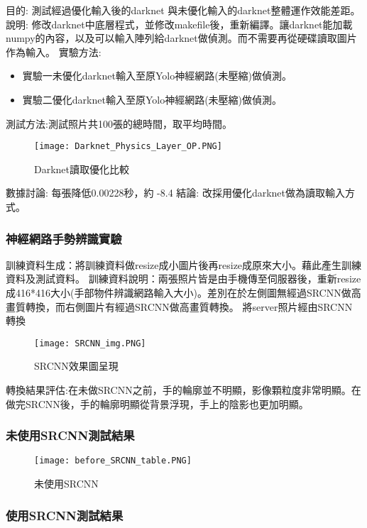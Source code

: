 目的: 測試經過優化輸入後的darknet 與未優化輸入的darknet整體運作效能差距。
說明: 修改darknet中底層程式，並修改makefile後，重新編譯。讓darknet能加載numpy的內容，以及可以輸入陣列給darknet做偵測。而不需要再從硬碟讀取圖片作為輸入。
實驗方法:
\begin{itemize}
\item 實驗一未優化darknet輸入至原Yolo神經網路(未壓縮)做偵測。
\item 實驗二優化darknet輸入至原Yolo神經網路(未壓縮)做偵測。
\end{itemize}

測試方法:測試照片共100張的總時間，取平均時間。
\begin{figure}[H]
    \centering
    \texttt{[image: Darknet\_Physics\_Layer\_OP.PNG]}
    \caption{Darknet讀取優化比較}
    \label{fig:Darknet讀取優化比較}
\end{figure}
數據討論: 
每張降低0.00228秒，約 -8.4%
結論: 
改採用優化darknet做為讀取輸入方式。


\subsubsection{神經網路手勢辨識實驗}

訓練資料生成：將訓練資料做resize成小圖片後再resize成原來大小。藉此產生訓練資料及測試資料。
訓練資料說明：兩張照片皆是由手機傳至伺服器後，重新resize成416*416大小(手部物件辨識網路輸入大小)。差別在於左側圖無經過SRCNN做高畫質轉換，而右側圖片有經過SRCNN做高畫質轉換。
將server照片經由SRCNN 轉換

\begin{figure}[H]
    \centering
    \texttt{[image: SRCNN\_img.PNG]}
    \caption{SRCNN效果圖呈現}
    \label{fig:SRCNN效果圖呈現}
\end{figure}

轉換結果評估:在未做SRCNN之前，手的輪廓並不明顯，影像顆粒度非常明顯。在做完SRCNN後，手的輪廓明顯從背景浮現，手上的陰影也更加明顯。

\subsubsection{未使用SRCNN測試結果}

\begin{figure}[H]
    \centering
    \texttt{[image: before\_SRCNN\_table.PNG]}
    \caption{未使用SRCNN}
    \label{fig:未使用SRCNN}
\end{figure}

\subsubsection{使用SRCNN測試結果}

